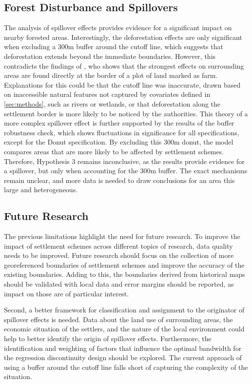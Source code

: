 \subsection{Forest Disturbance and Spillovers}
The analysis of spillover effects provides evidence for a significant impact on nearby forested areas.
Interestingly, the deforestation effects are only significant when excluding a 300m buffer around the cutoff line, which suggests that deforestation extends beyond the immediate boundaries.
However, this contradicts the findings of \cite{brandtSustainableIntensificationDairy2018}, who shows that the strongest effects on surrounding areas are found directly at the border of a plot of land marked as farm.
Explanations for this could be that the cutoff line was inaccurate, drawn based on inaccessible natural features not captured by covariates defined in \cref{sec:methods}, such as rivers or wetlands,
or that deforestation along the settlement border is more likely to be noticed by the authorities.
This theory of a more complex spillover effect is further supported by the results of the buffer robustness check, which shows fluctuations in significance for all specifications, except for the Donut specification.
By excluding this 300m donut, the model compares areas that are more likely to be affected by settlement schemes.
Therefore, Hypothesis 3 remains inconclusive, as the results provide evidence for a spillover, but only when accounting for the 300m buffer.
The exact mechanisms remain unclear, and more data is needed to draw conclusions for an area this large and heterogeneous.



\subsection{Future Research}
The previous limitations highlight the need for future research.
To improve the impact of settlement schemes across different topics of research, data quality needs to be improved.
Future research should focus on the collection of more georeferenced boundaries of settlement schemes and improve the accuracy of the existing boundaries.
Adding to this, the boundaries derived from historical maps should be validated with local data and error margins should be reported, as impact on those are of particular interest.

Second, a better framework for classification and assignment to the originator of spillover effects is needed.
Data about the land use of surrounding areas, the economic situation of the settlers, and the nature of the local environment could help to better identify the origin of spillover effects.
Furthermore, the identification and weighting of factors that influence the optimal bandwidth for the regression discontinuity design should be explored.
The current approach of using a buffer around the cutoff line falls short of capturing the complexity of the situation.

